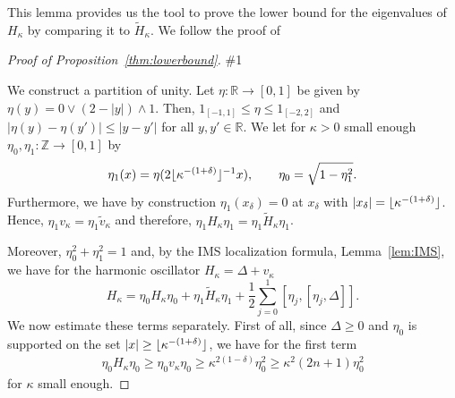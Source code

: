 \documentclass[12pt, reqno]{amsart}
\theoremstyle{definition}
\numberwithin{equation}{section}
\newcommand{\Z}{{\mathbb Z}}
\newcommand{\R}{{\mathbb R}}
\newcommand{\lorenzorrection}[1]{\#1}%
\DeclarePairedDelimiter\floor{\lfloor}{\rfloor}
\begin{document}
This lemma provides us the tool to prove the lower bound for the eigenvalues of $H_\kappa$ by comparing it to $\tilde H_\kappa$. We follow the proof of \cite[Theorem 3.2]{Simon_1983}

\begin{proof}[Proof of Proposition~\ref{thm:lowerbound}] \lorenzorrection{The proof works by induction on the energy level index $n\geq 0$. We  argue the induction step and will see that the base case  $n=0$ is indeed a special case of the induction step (where no induction hypothesis is needed). Suppose we have proven for all $m\leq n-1$ that
\begin{equation*}
    E_m(\kappa) \geq \kappa^2(2m+1) + o(\kappa^2).
\end{equation*} We shall now prove that the statement is valid the case $m=n$.}


We construct a partition of unity. Let $ \eta :\R\to[0,1]$ be given by $\eta(y) =0\vee(2-|y|  )\wedge 1$. Then, $1_{[-1,1]}\leq \eta\leq 1_{[-2,2]}$ and $|\eta(y)-\eta(y')|\leq |y-y'|$ for all $y,y'\in \R$. We let for $\kappa>0$ small enough
   $\eta_0,\eta_1:\Z\to [0,1]$ by
   $$\eta_1(x)=\eta(2\floor{\kappa^{-(1+\delta)}}^{-1} x ),\qquad\eta_0=\sqrt{1-\eta_1^2}.$$
   Furthermore, we have by construction $\eta_1(x_\delta)=0$  at $x_\delta$ with $|x_\delta|=\floor{\kappa^{-(1+\delta)}}$. Hence, $\eta_1v_\kappa=\eta_1\tilde v_\kappa$ and therefore, $\eta_1 H_\kappa \eta_1=\eta_1 \tilde H_\kappa \eta_1$.

  Moreover, $\eta_0^2+\eta_1^2=1$ and, by the IMS localization formula, Lemma~\ref{lem:IMS}, we have for the harmonic oscillator $H_\kappa=\Delta + v_\kappa$
   \[H_\kappa= \eta_0 H_\kappa \eta_0 +\eta_1 \tilde H_\kappa \eta_1+\frac12\sum_{j=0}^1 [\eta_j,[\eta_j,\Delta]].\]
   We now estimate these terms separately. First of all, since $\Delta\ge0$ and  $\eta_0$ is supported on the set $|x|\geq \floor{\kappa^{-(1+\delta)}}$, we have for the first term 
\begin{align*}
\eta_0 H_\kappa \eta_0 \ge \eta_0 v_\kappa \eta_0 \geq  \kappa^{2(1-\delta)} \eta_0^2 \ge \kappa^2(2n+1) \eta_0^2   
\end{align*}
    for  $\kappa$ small enough. 
    

\end{proof}
\end{document}
